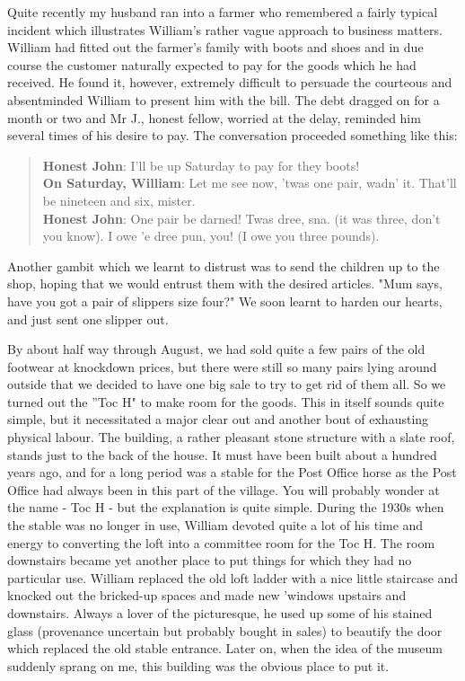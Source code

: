 Quite recently my husband ran into a farmer who remembered a fairly typical incident which illustrates William’s rather vague approach to business matters. William had fitted out the farmer's family with boots and shoes and in due course the customer naturally expected to pay for the goods which he had received. He found it, however, extremely difficult to persuade the courteous and absentminded William to present him with the bill. The debt dragged on for a month or two and Mr J., honest fellow, worried at the delay, reminded him several times of his desire to pay. The conversation proceeded something like this:

\begin{quote}
\textbf{Honest John}: I'll be up Saturday to pay for they boots! \\
\textbf{On Saturday, William}: Let me see now, 'twas one pair, wadn' it. That'll be nineteen and six, mister. \\
\textbf{Honest John}: One pair be darned! Twas dree, sna. (it was three, don’t you know). I owe 'e dree pun, you! (I owe you three pounds).
\end{quote}

Another gambit which we learnt to distrust was to send the children up to the shop, hoping that we would entrust them with the desired articles. "Mum says, have you got a pair of slippers size four?" We soon learnt to harden our hearts, and just sent one slipper out.

By about half way through August, we had sold quite a few pairs of the old footwear at knockdown prices, but there were still so many pairs lying around outside that we decided to have one big sale to try to get rid of them all. So we turned out the ”Toc H" to make room for the goods. This in itself sounds quite simple, but it necessitated a major clear out and another bout of exhausting physical labour. The building, a rather pleasant stone structure with a slate roof, stands just to the back of the house. It must have been built about a hundred years ago, and for a long period was a stable for the Post Office horse as the Post Office had always been in this part of the village. You will probably wonder at the name - Toc H - but the explanation is quite simple. During the 1930s when the stable was no longer in use, William devoted quite a lot of his time and energy to converting the loft into a committee room for the Toc H. The room downstairs became yet another place to put things for which they had no particular use. William replaced the old loft ladder with a nice little staircase and knocked out the bricked-up spaces and made new 'windows upstairs and downstairs. Always a lover of the picturesque, he used up some of his stained glass (provenance uncertain but probably bought in sales) to beautify the door which replaced the old stable entrance. Later on, when the idea of the museum suddenly sprang on me, this building was the obvious place to put it.

